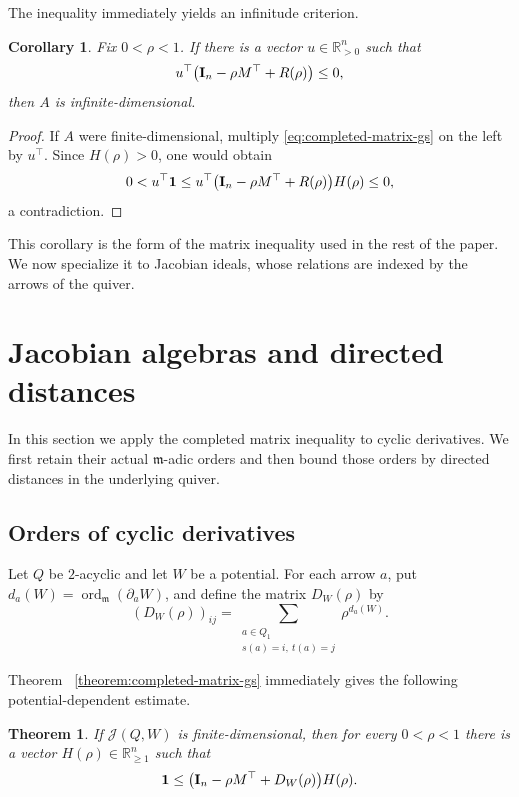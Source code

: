 \documentclass[11pt,letterpaper,reqno]{amsart}
\newtheorem{theorem}{Theorem}[section]
\newtheorem{corollary}[corollary]{Corollary}
\theoremstyle{definition}
\DeclareMathOperator{\ord}{ord}
\newcommand{\m}{\mathfrak m}
\newcommand{\one}{\mathbf 1}
\newcommand{\Jac}{\mathcal J}
\begin{document}
	The inequality immediately yields an infinitude criterion.
	
	\begin{corollary}
		\label{corollary:relation-obstruction}
		Fix $0<\rho<1$.  If there is a vector
		$u\in\mathbb R_{>0}^{n}$ such that
		\[
		u^{\top}
		\bigl({\bf I}_{n}-\rho M^{\top}+R(\rho)\bigr)\leq0,
		\]
		then $A$ is infinite-dimensional.
	\end{corollary}
	
	\begin{proof}
		If $A$ were finite-dimensional, multiply
		\eqref{eq:completed-matrix-gs} on the left by $u^{\top}$.  Since
		$H(\rho)>0$, one would obtain
		\[
		0<u^{\top}\one
		\leq u^{\top}
		\bigl({\bf I}_{n}-\rho M^{\top}+R(\rho)\bigr)H(\rho)
		\leq0,
		\]
		a contradiction.
	\end{proof}
	
	This corollary is the form of the matrix inequality used in the rest of the
	paper.  We now specialize it to Jacobian ideals, whose relations are indexed
	by the arrows of the quiver.
	
	\section{Jacobian algebras and directed distances}
	\label{sec:jacobian}
	
	In this section we apply the completed matrix inequality to cyclic
	derivatives.  We first retain their actual $\m$-adic orders and then bound
	those orders by directed distances in the underlying quiver.
	
	\subsection{Orders of cyclic derivatives}
	
	Let $Q$ be $2$-acyclic and let $W$ be a potential.  For each arrow $a$, put $d_a(W)=\ord_{\m}(\partial_aW)$, and define the matrix $D_W(\rho)$ by
	\[
	(D_W(\rho))_{ij}
	=\sum_{\substack{a\in Q_1\\s(a)=i,\ t(a)=j}}
	\rho^{d_a(W)}.
	\]
	
	Theorem~
	\ref{theorem:completed-matrix-gs} immediately gives the following
	potential-dependent estimate.
	
	\begin{theorem}
		\label{theorem:potential-order}
		If $\Jac(Q,W)$ is finite-dimensional, then for every $0<\rho<1$ there is a
		vector $H(\rho)\in\mathbb R_{\geq1}^{n}$ such that
		\begin{equation}
			\label{eq:potential-order}
			\one\leq
			\bigl({\bf I}_{n}-\rho M^{\top}+D_W(\rho)\bigr)H(\rho).
		\end{equation}
	\end{theorem}
	
\end{document}
